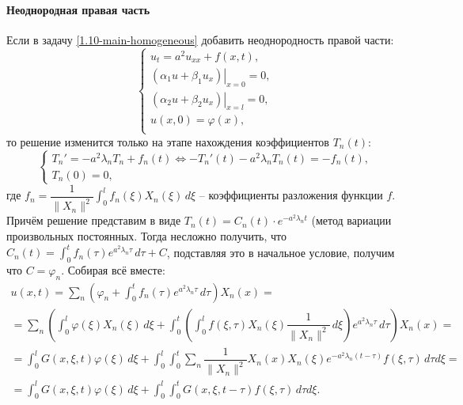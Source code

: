 \paragraph{Неоднородная правая часть} Если в задачу \eqref{1.10-main-homogeneous} добавить 
неоднородность правой части:
\begin{equation}
  \begin{cases}
    u_t = a^2 u_{xx} + f(x, t), \\
    \left. \left( \alpha_1 u + \beta_1 u_x \right) \right|_{x=0} = 0, \\
    \left. \left( \alpha_2 u + \beta_2 u_x \right) \right|_{x = l} = 0, \\
    u(x, 0) = \varphi(x), \\
  \end{cases}
\end{equation}
то решение изменится только на этапе нахождения коэффициентов $T_n(t)$:
\[
  \begin{cases}
    T_n' = - a^2 \lambda_n T_n + f_n(t)
      \Leftrightarrow
      -T_n'(t) - a^2 \lambda_n T_n(t) = - f_n(t), \\
    T_n(0) = 0,
  \end{cases}
\]
где $f_n = \dfrac{1}{\|X_n\|^2} \int_0^l f_n(\xi) X_n(\xi) \, d\xi$ -- коэффициенты разложения
функции $f$. Причём решение представим в виде $T_n(t) = C_n(t) \cdot e^{-a^2 \lambda_n t}$
(метод вариации произвольных постоянных. Тогда несложно получить, что
$C_n(t) = \int_0^t f_n(\tau) e^{a^2 \lambda_n \tau} \, d\tau + C$, подставляя это в начальное
условие, получим что $C = \varphi_n$. Собирая всё вместе:
\begin{multline*}
  u(x, t)
  = \sum_n \left( \varphi_n + \int_0^t f_n(\tau) e^{a^2 \lambda_n \tau} \, d\tau \right) X_n(x) = \\
  = \sum_n \left( \int_0^l \varphi(\xi) X_n(\xi) \, d\xi
    + \int_0^t \left( \int_0^l f(\xi, \tau) X_n(\xi) \dfrac{1}{\| X_n \|^2} \, d\xi 
    \right) e^{a^2 \lambda_n \tau} \, d\tau \right) X_n(x) = \\
  = \int_0^l G(x, \xi, t) \varphi(\xi) \, d\xi
  + \int_0^l \int_0^t \sum_n \dfrac{1}{\|X_n\|^2} X_n(x) X_n(\xi) e^{-a^2 \lambda_n (t-\tau)} f(\xi, \tau) \, d\tau d\xi = \\
  = \int_0^l G(x, \xi, t) \varphi(\xi) \, d\xi
    + \int_0^l \int_0^t G(x, \xi, t-\tau) f(\xi, \tau) \, d\tau d\xi.
\end{multline*}
